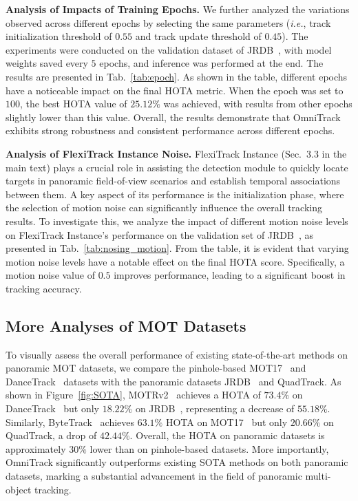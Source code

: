 \noindent\textbf{Analysis of Impacts of Training Epochs.} We further analyzed the variations observed across different epochs by selecting the same parameters (\textit{i.e.}, track initialization threshold of $0.55$ and track update threshold of $0.45$). The experiments were conducted on the validation dataset of JRDB~\cite{martin2021jrdb}, with model weights saved every $5$ epochs, and inference was performed at the end. The results are presented in Tab.~\ref{tab:epoch}. 
As shown in the table, different epochs have a noticeable impact on the final HOTA metric. When the epoch was set to $100$, the best HOTA value of $25.12\%$ was achieved, with results from other epochs slightly lower than this value. Overall, the results demonstrate that OmniTrack exhibits strong robustness and consistent performance across different epochs.

\noindent\textbf{Analysis of FlexiTrack Instance Noise.} 
FlexiTrack Instance (Sec.~3.3 in the main text) plays a crucial role in assisting the detection module to quickly locate targets in panoramic field-of-view scenarios and establish temporal associations between them. A key aspect of its performance is the initialization phase, where the selection of motion noise can significantly influence the overall tracking results. To investigate this, we analyze the impact of different motion noise levels on FlexiTrack Instance’s performance on the validation set of JRDB~\cite{martin2021jrdb}, as presented in Tab.~\ref{tab:nosing_motion}. 
From the table, it is evident that varying motion noise levels have a notable effect on the final HOTA score. 
Specifically, a motion noise value of $0.5$ improves performance, leading to a significant boost in tracking accuracy.

\subsection{More Analyses of MOT Datasets}
To visually assess the overall performance of existing state-of-the-art methods on panoramic MOT datasets, we compare the pinhole-based MOT17~\cite{milan2016mot16} and DanceTrack~\cite{peize2021dance} datasets with the panoramic datasets JRDB~\cite{martin2021jrdb} and QuadTrack. As shown in Figure~\ref{fig:SOTA}, MOTRv2~\cite{zhang2023motrv2} achieves a HOTA of $73.4\%$ on DanceTrack~\cite{peize2021dance} but only $18.22\%$ on JRDB~\cite{martin2021jrdb}, representing a decrease of $55.18\%$. Similarly, ByteTrack~\cite{zhang2022bytetrack} achieves $63.1\%$ HOTA on MOT17~\cite{milan2016mot16} but only $20.66\%$ on QuadTrack, a drop of $42.44\%$. Overall, the HOTA on panoramic datasets is approximately $30\%$ lower than on pinhole-based datasets. More importantly, OmniTrack significantly outperforms existing SOTA methods on both panoramic datasets, marking a substantial advancement in the field of panoramic multi-object tracking.


